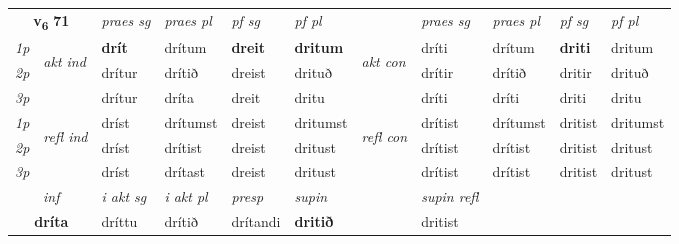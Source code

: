 \noindent
\begin{tabular}{lllllllllll} \toprule
\multicolumn{2}{c}{\textbf{v{\textsubscript{6}}} \Large{\textbf{71}}}  &  \textit{praes sg}  & \textit{praes pl}  &\textit{ pf sg} & \textit{pf pl} &  &  \textit{praes sg}  & \textit{praes pl}  & \textit{pf sg} & \textit{pf pl } \\*
	\cmidrule{3-6} \cmidrule{8-11}
 {\textit{1p}} & \multirow{3}{*}{\begin{turn}{90}\textit{akt ind}\end{turn}} & \textbf{drít} & drítum & \textbf{dreit} & \textbf{dritum} & \multirow{3}{*}{\begin{turn}{90}\textit{akt con}\end{turn}} &dríti & drítum & \textbf{driti} & dritum\\*
 {\textit{2p}} &  &  drítur  & drítið & dreist & drituð & & drítir & drítið & dritir & drituð \\*
{\textit{3p}} &  & drítur & dríta & dreit & dritu & & dríti & dríti& driti & dritu \\*
\cmidrule{3-6} \cmidrule{8-11}
 {\textit{1p}} & \multirow{3}{*}{\begin{turn}{90}\textit{refl ind}\end{turn}}  & dríst & drítumst & dreist & dritumst & \multirow{3}{*}{\begin{turn}{90}\textit{refl con}\end{turn}}  &drítist & drítumst & dritist & dritumst \\*
 {\textit{2p}} &  & dríst & drítist & dreist & dritust & &drítist & drítist & dritist & dritust \\*
 {\textit{3p}}  & & dríst & drítast & dreist & dritust & & drítist & drítist& dritist & dritust \\*
\cmidrule{3-6} \cmidrule{8-11}

   \multicolumn{2}{c}{\textit{inf}}  & \textit{i akt sg} & \textit{i akt pl}   & \textit{presp} & \textit{supin} && \textit{supin refl}  \\*
  \multicolumn{2}{c}{\textbf{dríta}} & dríttu  & drítið   & drítandi &  \textbf{dritið} && dritist  \\*
\end{tabular}

